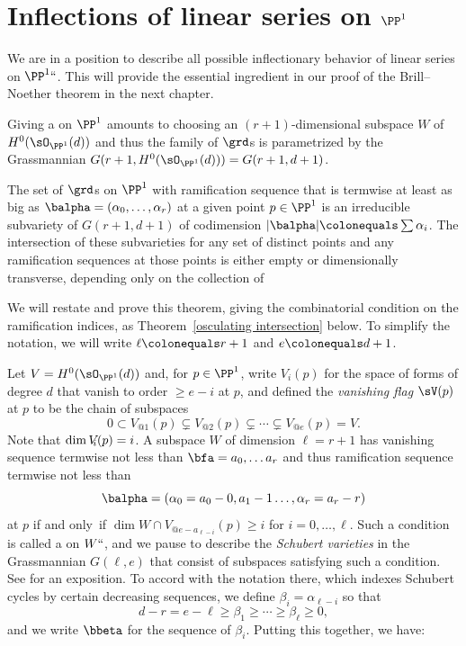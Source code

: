 \section{Inflections of linear series on $\PP^1$}

We are in a position to describe all possible inflectionary behavior of
%
%
linear series on $\PP^1` `$. This will provide the essential ingredient
in our proof of the Brill--Noether theorem in the next chapter.

Giving a 
\blue{$\grd$}
%
on $\PP^{1}$ amounts to choosing an $(r+1)$-dimensional
subspace $W$ of  $H^{0}(\sO_{\PP^{1}}(d))$ and thus the family of $\grd$s
is parametrized by the
Grassmannian 
%
$G(r+1, H^{0}(\sO_{\PP^{1}}(d))) = G(r+1, d+1)$.

\begin{theorem}\label{transversality of ramification}
The set of $\grd$s on $\PP^{1}$  with ramification sequence that is
termwise at least as big as $\balpha = (\alpha_{0}, \dots, \alpha_{r})$
at a
given point $p\in \PP^{1}$
is an irreducible subvariety of $G(r+1,d+1)$ of codimension 
$|\balpha| \colonequals  \sum \alpha_{i}$. The intersection
of these subvarieties for any set of distinct points and any ramification
sequences at those points
is either empty or 
%
dimensionally transverse, depending only on the
collection of 
%
\end{theorem}

We will restate and prove this theorem, giving the combinatorial condition
on the ramification indices,
as Theorem~\ref{osculating intersection} below. To simplify the notation,
we will write $\ell \colonequals  r+1$ 
and
$e\colonequals  d+1$.


Let $V =H^{0}(\sO_{\PP^{1}}(d))$ and, for $p\in \PP^{1}$, write $V_{i}(p)$
for the space of
forms of degree $d$ that vanish to order $\geq e-i$ at $p$, and defined
%
the \emph{vanishing flag} $\sV(p)$ at $p$
to be the chain of subspaces
$$
0\subset V_{@1}(p) \subsetneq V_{@2}(p) \subsetneq\cdots\subsetneq V_{@e}(p)
= V.
$$
Note that $\dim V_{\mskip-5mu i}(p) = i$.
A subspace $W$ of dimension $\ell = r+1$ has vanishing sequence termwise
not less than
$\bfa = a_{0}, \dots a_{r}$ and thus
ramification sequence termwise not less than
$$
\balpha = (\alpha_{0} = a_{0}-0, a_{1}-1 \dots, \alpha_{r}= a_{r}-r)
$$
 at $p$ if and only~if
$\dim W\cap V_{@e-a_{\ell-i}}(p)\geq  i$  for  $i = 0,\dots, \ell$.
Such a condition is called a 
%
%
on $W` `$, and we pause to describe the \emph{Schubert varieties} in
the Grassmannian $G(\ell, e)$ that consist
of subspaces satisfying such a condition. See 
\cite[Chapters
3 and 4]{3264} for an exposition.
To accord with the notation there, which indexes Schubert cycles by
certain decreasing sequences,
we define $\beta_{i} = \alpha_{\ell-i}$ so that
$$
d-r = e-\ell \geq \beta_{1} \geq \cdots \geq \beta_{\ell}\geq 0,
$$
and we write $\bbeta$ for the sequence of $\beta_{i}$. Putting this
together, we have:

